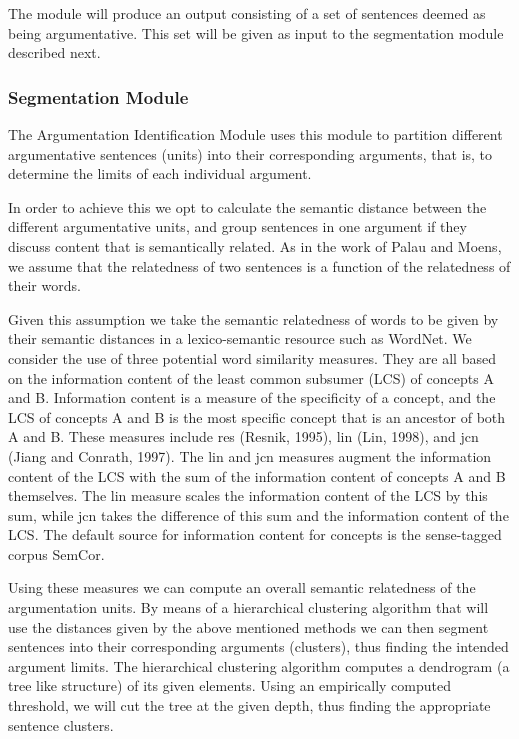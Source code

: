 The module will produce an output consisting of a set of sentences deemed as being argumentative. This set will be given as input to the segmentation module described next.

\subsubsection{Segmentation Module}
\par
The Argumentation Identification Module uses this module to partition different argumentative sentences (units) into their corresponding arguments, that is, to determine the limits of each individual argument.
\par
In order to achieve this we opt to calculate the semantic distance between the different argumentative units, and group sentences in one argument if they discuss content that is semantically related. As in the work of Palau and Moens\cite{Palau}, we assume that the relatedness of two sentences is a function of the relatedness of their words.
\par
Given this assumption we take the semantic relatedness of words to be given by their semantic distances in a lexico-semantic resource such as WordNet. We consider the use of three potential word similarity measures.
They are all based on the information content of the least common subsumer (LCS)
of concepts A and B. Information content is a measure of the specificity of a concept, and the LCS of concepts A and B is the most specific concept that is an ancestor of
both A and B. These measures include res (Resnik, 1995)\cite{Resnik}, lin (Lin, 1998)\cite{lin}, and jcn (Jiang and Conrath, 1997)\cite{jcn}.
The lin and jcn measures augment the information content of the LCS with the sum of the information content
of concepts A and B themselves. The lin measure scales the information content of the LCS by this sum, while jcn takes the difference of this sum and the information content of the LCS.
The default source for information content for concepts is the sense-tagged corpus SemCor.

\par
Using these measures we can compute an overall semantic relatedness of the argumentation units. By means of a hierarchical clustering algorithm that will use the distances given by the above mentioned methods we can then segment sentences
into their corresponding arguments (clusters), thus finding the intended argument limits. The hierarchical clustering algorithm computes a dendrogram (a tree like structure) of its given elements. Using an empirically computed threshold, we will cut
the tree at the given depth, thus finding the appropriate sentence clusters.

